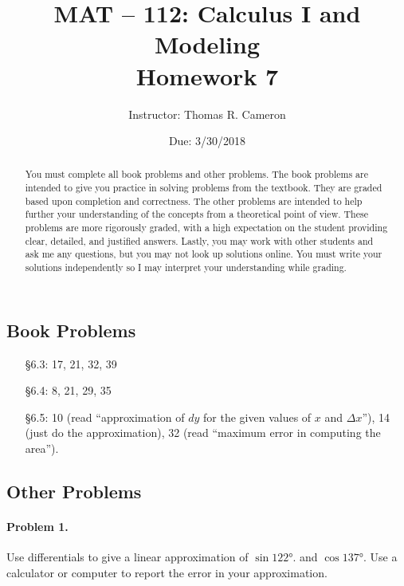 \documentclass{article}
\title{MAT -- 112: Calculus I and Modeling\\
\large{Homework 7}}
\author{Instructor: Thomas R. Cameron}
\date{Due: 3/30/2018}
\begin{document}
\maketitle

\begin{abstract}
You must complete all book problems and other problems. The book problems are intended to give you practice in solving problems from the textbook. They are graded based upon completion and correctness. The other problems are intended to help further your understanding of the concepts from a theoretical point of view. These problems are more rigorously graded, with a high expectation on the student providing clear, detailed, and justified answers. Lastly, you may work with other students and ask me any questions, but you may not look up solutions online. You must write your solutions independently so I may interpret your understanding while grading. 
\end{abstract}

\subsection*{Book Problems}
\begin{itemize}
\item   [\S 6.3:] 17, 21, 32, 39
\item   [\S 6.4:] 8, 21, 29, 35
\item   [\S 6.5:] 10 (read ``approximation of $dy$ for the given values of $x$ and $\Delta x$''), 14 (just do the approximation), 32 (read ``maximum error in computing the area''). 
\end{itemize}

\subsection*{Other Problems}

\paragraph*{Problem 1.} Use differentials to give a linear approximation of $\sin\ang{122}$. and $\cos\ang{137}$. Use a calculator or computer to report the error in your approximation. 
\end{document}
